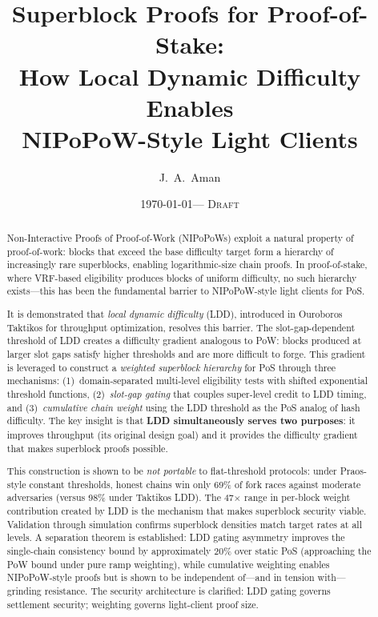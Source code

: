 \documentclass[11pt]{article}
\title{Superblock Proofs for Proof-of-Stake:\\
How Local Dynamic Difficulty Enables\\
NIPoPoW-Style Light Clients}
\author{J.~A.~Aman}
\date{\today \quad --- \quad \textsc{Draft}}
\begin{document}
\maketitle

\begin{abstract}
Non-Interactive Proofs of Proof-of-Work (NIPoPoWs) exploit a natural property of proof-of-work: blocks that exceed the base difficulty target form a hierarchy of increasingly rare superblocks, enabling logarithmic-size chain proofs. In proof-of-stake, where VRF-based eligibility produces blocks of uniform difficulty, no such hierarchy exists---this has been the fundamental barrier to NIPoPoW-style light clients for PoS.

It is demonstrated that \emph{local dynamic difficulty} (LDD), introduced in Ouroboros Taktikos for throughput optimization, resolves this barrier. The slot-gap-dependent threshold of LDD creates a difficulty gradient analogous to PoW: blocks produced at larger slot gaps satisfy higher thresholds and are more difficult to forge. This gradient is leveraged to construct a \emph{weighted superblock hierarchy} for PoS through three mechanisms: (1)~domain-separated multi-level eligibility tests with shifted exponential threshold functions, (2)~\emph{slot-gap gating} that couples super-level credit to LDD timing, and (3)~\emph{cumulative chain weight} using the LDD threshold as the PoS analog of hash difficulty. The key insight is that \textbf{LDD simultaneously serves two purposes}: it improves throughput (its original design goal) and it provides the difficulty gradient that makes superblock proofs possible.

This construction is shown to be \emph{not portable} to flat-threshold protocols: under Praos-style constant thresholds, honest chains win only 69\% of fork races against moderate adversaries (versus 98\% under Taktikos LDD). The 47$\times$ range in per-block weight contribution created by LDD is the mechanism that makes superblock security viable. Validation through simulation confirms superblock densities match target rates at all levels. A separation theorem is established: LDD gating asymmetry improves the single-chain consistency bound by approximately 20\% over static PoS (approaching the PoW bound under pure ramp weighting), while cumulative weighting enables NIPoPoW-style proofs but is shown to be independent of---and in tension with---grinding resistance. The security architecture is clarified: LDD gating governs settlement security; weighting governs light-client proof size.
\end{abstract}
\end{document}
